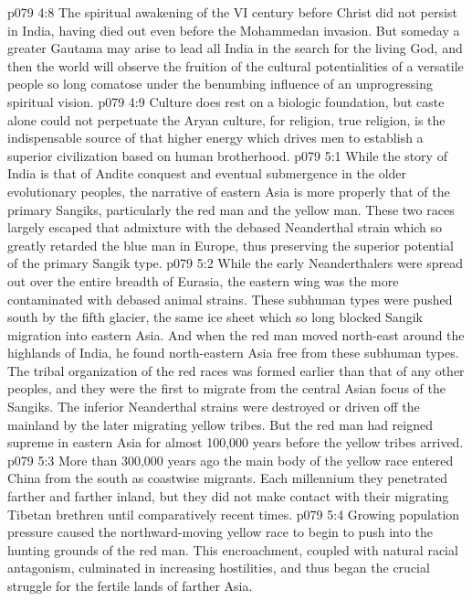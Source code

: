 \vs p079 4:8 The spiritual awakening of the VI century before Christ did not persist in India, having died out even before the Mohammedan invasion. But someday a greater Gautama may arise to lead all India in the search for the living God, and then the world will observe the fruition of the cultural potentialities of a versatile people so long comatose under the benumbing influence of an unprogressing spiritual vision.
\vs p079 4:9 Culture does rest on a biologic foundation, but caste alone could not perpetuate the Aryan culture, for religion, true religion, is the indispensable source of that higher energy which drives men to establish a superior civilization based on human brotherhood.
\vs p079 5:1 While the story of India is that of Andite conquest and eventual submergence in the older evolutionary peoples, the narrative of eastern Asia is more properly that of the primary Sangiks, particularly the red man and the yellow man. These two races largely escaped that admixture with the debased Neanderthal strain which so greatly retarded the blue man in Europe, thus preserving the superior potential of the primary Sangik type.
\vs p079 5:2 While the early Neanderthalers were spread out over the entire breadth of Eurasia, the eastern wing was the more contaminated with debased animal strains. These subhuman types were pushed south by the fifth glacier, the same ice sheet which so long blocked Sangik migration into eastern Asia. And when the red man moved north\hyp{}east around the highlands of India, he found north\hyp{}eastern Asia free from these subhuman types. The tribal organization of the red races was formed earlier than that of any other peoples, and they were the first to migrate from the central Asian focus of the Sangiks. The inferior Neanderthal strains were destroyed or driven off the mainland by the later migrating yellow tribes. But the red man had reigned supreme in eastern Asia for almost 100,000 years before the yellow tribes arrived.
\vs p079 5:3 \pc More than 300,000 years ago the main body of the yellow race entered China from the south as coastwise migrants. Each millennium they penetrated farther and farther inland, but they did not make contact with their migrating Tibetan brethren until comparatively recent times.
\vs p079 5:4 Growing population pressure caused the northward\hyp{}moving yellow race to begin to push into the hunting grounds of the red man. This encroachment, coupled with natural racial antagonism, culminated in increasing hostilities, and thus began the crucial struggle for the fertile lands of farther Asia.
